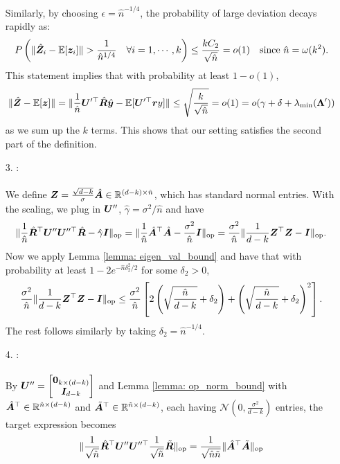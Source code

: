 \begin{enumerate}
Similarly, by choosing \(\epsilon = \hat{n}^{-1/4}\), the probability of large deviation decays rapidly as:
\[
P\left(\|\hat{{\bm{Z}}}_i- \mathbb{E}[{\bm{z}}_i]\| > \frac{1}{\hat{n}^{1/4}} \quad \forall i = 1, \cdots, k \right) \leq \frac{kC_2}{\sqrt{\hat{n}}} = o(1) \quad \text{since } \hat{n} = \omega(k^2).
\]
This statement implies that with probability at least $1 - o(1)$, 
 \[
    \|\hat{{\bm{Z}}} - \mathbb{E}[{\bm{z}}]\| = \| \frac{1}{\hat{n}} {\bm{U}}'^\top \hat{{\bm{R}}}\hat{{\bm{y}}} -\mathbb{E}[ {\bm{U}}'^\top{\bm{r}} y]  \| \leq \sqrt{\frac{k}{\sqrt{\hat{n}}}} = o(1) = o(\gamma+\delta+\lambda_{\min}( {\bm{\Lambda}}' )) 
 \]
 as we sum up the $k$ terms. This shows that our setting satisfies the second part of the definition. 
    \item[3.] \isotropy{}: \\ \\
    We define ${\bm{Z}} = \frac{\sqrt{d-k}}{\sigma}\hat{{\bm{A}}} \in \mathbb{R}^{(d-k) \times \hat{n} }$, which has standard normal entries. With the scaling, we plug in ${\bm{U}}''$, $\hat{\gamma} = \sigma^2/\hat{n}$ and have
\begin{align} \label{eq: kernel_wise_entropy_op}
    \lVert \frac{1}{\hat{n}} \hat{{\bm{R}}}^\top{\bm{U}}''{\bm{U}}''^\top \hat{{\bm{R}}} -\hat{\gamma} {\bm{I}}  \rVert_{\mathrm{op}} = \lVert \frac{1}{\hat{n}} \hat{{\bm{A}}}^\top\hat{{\bm{A}}} -\frac{\sigma^2}{\hat{n}} {\bm{I}}  \rVert_{\mathrm{op}} = \frac{\sigma^2}{\hat{n}}\lVert \frac{1}{d-k} {\bm{Z}}^\top{\bm{Z}} -{\bm{I}}  \rVert_{\mathrm{op}}. 
\end{align}
Now we apply Lemma \ref{lemma: eigen_val_bound} and have that with probability at least $1 - 2e^{-\hat{n}\delta_2^2/2}$ for some $\delta_2 > 0$, 
\[
    \frac{\sigma^2}{\hat{n}}\lVert \frac{1}{d-k} {\bm{Z}}^\top{\bm{Z}} -{\bm{I}}  \rVert_{\mathrm{op}} \leq \frac{\sigma^2}{\hat{n}} \left[ 2\left(\sqrt{\frac{\hat{n}}{d-k}} + \delta_2 \right) + \left(\sqrt{\frac{\hat{n}}{d-k}} + \delta_2 
    \right)^2 \right]. 
\]
The rest follows similarly by taking $\delta_2 = \hat{n}^{-1/4}$. 
    \item[4.] \smallin{}: \\ \\ 
    By ${\bm{U}}'' =  \begin{bmatrix}
    \mathbf{0}_{k \times (d-k)} \\ {\bm{I}}_{d-k}
\end{bmatrix}$ and Lemma \ref{lemma: op_norm_bound} with $\hat{{\bm{A}}}^\top \in \mathbb{R}^{\hat{n} \times (d-k)}$ and $\tilde{{\bm{A}}}^\top \in \mathbb{R}^{\tilde{n} \times (d-k)}$, each having $\mathcal{N}(0, \frac{\sigma^2}{d-k})$ entries, the target expression becomes 
\begin{align}
    \opnorm{\frac{1}{\sqrt{\hat{n}}} \hat{\mR}^\top \mU''\mU''^\top \frac{1}{\sqrt{\tilde{n}}}\tilde{\mR}} & =  \frac{1}{\sqrt{\hat{n}\tilde{n}}} \opnorm{\hat{\mA}^\top\tilde{\mA}} \label{eq: cross_sample_op}\\ 

\end{align}
\end{enumerate}
